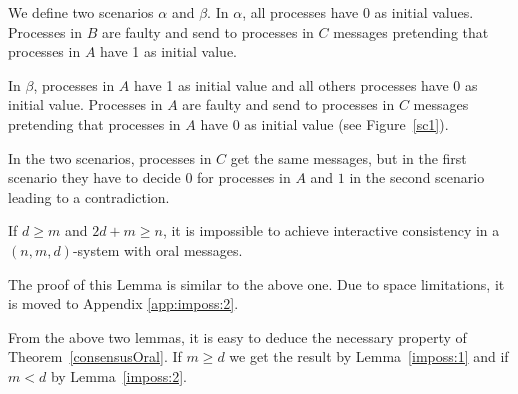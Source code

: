   We define two scenarios $\alpha$ and $\beta$.
  In $\alpha$, all processes have 0 as initial values.
  Processes in $B$ are faulty and send  to processes in $C$ messages
  pretending that processes in $A$ have 1 as initial value.
  
  In $\beta$, processes in $A$ have 1 as initial value and all  others processes have 0 as initial value.
  Processes in $A$ are faulty and send to processes in $C$ messages 
  pretending that processes in $A$ have 0 as initial value (see Figure~\ref{sc1}).
  
  In the two scenarios, processes in $C$ get the same messages, but in the first scenario 
  they have to decide 0 for processes in $A$ and $1$ in the second scenario leading to a contradiction.


\begin{lemma}\label{imposs:2}
  If $d \geqslant m$ and $2d+m \geqslant n$, it is impossible to achieve interactive consistency in a $(n,m,d)$-system with oral messages.\end{lemma}

The proof of this Lemma is similar to the above one. Due to space limitations, it is moved to Appendix \ref{app:imposs:2}.

From the above two lemmas, it is easy to deduce the necessary property of 
Theorem~\ref{consensusOral}. 
If $m \geqslant d$ we get the result by Lemma~\ref{imposs:1} and  if $m<d$ by Lemma~\ref{imposs:2}.





